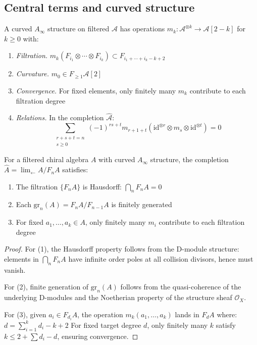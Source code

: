 \subsection{Central terms and curved structure}

\begin{definition}
A curved $A_\infty$ structure on filtered $\mathcal{A}$ has operations $m_k: \mathcal{A}^{\otimes k} \to \mathcal{A}[2-k]$ for $k \geq 0$ with:
\begin{enumerate}
\item \emph{Filtration.} $m_k(F_{i_1} \otimes \cdots \otimes F_{i_k}) \subset F_{i_1+\cdots+i_k-k+2}$
\item \emph{Curvature.} $m_0 \in F_{\geq 1}\mathcal{A}[2]$
\item \emph{Convergence.} For fixed elements, only finitely many $m_k$ contribute to each filtration degree
\item \emph{Relations.} In the completion $\widehat{\mathcal{A}}$:
   \[\sum_{\substack{r+s+t=n \\ s \geq 0}} (-1)^{rs+t} m_{r+1+t}(\text{id}^{\otimes r} \otimes m_s \otimes \text{id}^{\otimes t}) = 0\]
\end{enumerate}
\end{definition}

\begin{proposition}\label{prop:curved-convergence}
For a filtered chiral algebra $A$ with curved $A_\infty$ structure, the completion $\hat{A} = \lim_{\leftarrow} A/F_nA$ satisfies:
\begin{enumerate}
\item The filtration $\{F_nA\}$ is Hausdorff: $\bigcap_n F_nA = 0$
\item Each $\text{gr}_n(A) = F_nA/F_{n-1}A$ is finitely generated
\item For fixed $a_1, \ldots, a_k \in A$, only finitely many $m_i$ contribute to each filtration degree
\end{enumerate}
\end{proposition}

\begin{proof}
For (1), the Hausdorff property follows from the D-module structure: elements in $\bigcap_n F_nA$ have infinite order poles at all collision divisors, hence must vanish.

For (2), finite generation of $\text{gr}_n(A)$ follows from the quasi-coherence of the underlying D-modules and the Noetherian property of the structure sheaf $\mathcal{O}_X$.

For (3), given $a_i \in F_{d_i}A$, the operation $m_k(a_1, \ldots, a_k)$ lands in $F_d A$ where:
$d = \sum_{i=1}^k d_i - k + 2$
For fixed target degree $d$, only finitely many $k$ satisfy $k \leq 2 + \sum d_i - d$, ensuring convergence.
\end{proof}

